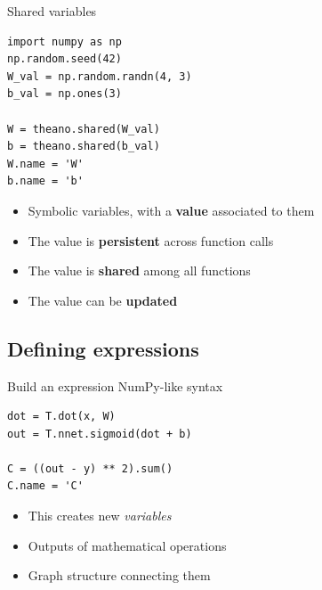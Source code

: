 \documentclass[a4paper,9pt]{beamer}
\begin{document}
\begin{frame}[fragile]{Shared variables}
  \begin{verbatim}
import numpy as np
np.random.seed(42)
W_val = np.random.randn(4, 3)
b_val = np.ones(3)

W = theano.shared(W_val)
b = theano.shared(b_val)
W.name = 'W'
b.name = 'b'
  \end{verbatim}
  \begin{itemize}
    \item Symbolic variables, with a \textbf{value} associated to them
    \item The value is \textbf{persistent} across function calls
    \item The value is \textbf{shared} among all functions
    \item The value can be \textbf{updated}
  \end{itemize}
\end{frame}

\subsection{Defining expressions}
\begin{frame}[fragile]{Build an expression}
  NumPy-like syntax
  \begin{verbatim}
dot = T.dot(x, W)
out = T.nnet.sigmoid(dot + b)

C = ((out - y) ** 2).sum()
C.name = 'C'
  \end{verbatim}

  \begin{itemize}
    \item This creates new \emph{variables}
    \item Outputs of mathematical operations
    \item Graph structure connecting them
  \end{itemize}
\end{frame}
\end{document}
